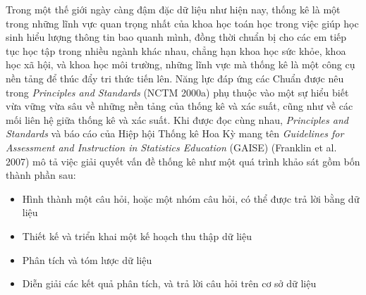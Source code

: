 \documentclass[
  10pt,
  a4paper,
  landscape,
  twoside,
  openany
]{scrbook}
\newcommand{\VI}[1]{#1}
\newcommand{\NOTE}[1]{#1}
\begin{document}
{
\VI{Trong một thế giới ngày càng đậm đặc dữ liệu như hiện nay, thống kê là một trong những lĩnh vực quan trọng nhất của khoa học toán học trong việc giúp học sinh hiểu lượng thông tin bao quanh mình, đồng thời chuẩn bị cho các em tiếp tục học tập trong nhiều ngành khác nhau, chẳng hạn khoa học sức khỏe, khoa học xã hội, và khoa học môi trường, những lĩnh vực mà thống kê là một công cụ nền tảng để thúc đẩy tri thức tiến lên. Năng lực đáp ứng các Chuẩn được nêu trong \emph{Principles and Standards} (NCTM 2000a) phụ thuộc vào một sự hiểu biết vừa vững vừa sâu về những nền tảng của thống kê và xác suất, cũng như về các mối liên hệ giữa thống kê và xác suất. Khi được đọc cùng nhau, \emph{Principles and Standards} và báo cáo của Hiệp hội Thống kê Hoa Kỳ mang tên \emph{Guidelines for Assessment and Instruction in Statistics Education} (GAISE) (Franklin et al. 2007) mô tả việc giải quyết vấn đề thống kê như một quá trình khảo sát gồm bốn thành phần sau:

\begin{itemize}
  \item Hình thành một câu hỏi, hoặc một nhóm câu hỏi, có thể được trả lời bằng dữ liệu
  \item Thiết kế và triển khai một kế hoạch thu thập dữ liệu
  \item Phân tích và tóm lược dữ liệu
  \item Diễn giải các kết quả phân tích, và trả lời câu hỏi trên cơ sở dữ liệu
\end{itemize}}
}
{
\NOTE{}
}
\end{document}
